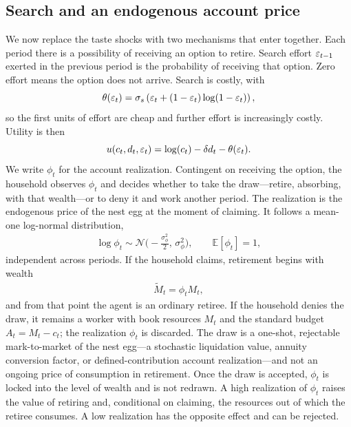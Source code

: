 \subsection{Search and an endogenous account price}
We now replace the taste shocks with two mechanisms that enter together. Each period
there is a possibility of receiving an option to retire. Search effort $\varepsilon_{t-1}$ exerted
in the previous period is the probability of receiving that option. Zero effort means the
option does not arrive. Search is costly, with
\begin{equation}
\theta(\varepsilon_t) = \sigma_s \left(\varepsilon_t + (1 - \varepsilon_t) \log (1 - \varepsilon_t)\right),
\end{equation}
so the first units of effort are cheap and further effort is increasingly costly. Utility is
then
\begin{equation}
u(c_t, d_t, \varepsilon_t) = \log(c_t) - \delta d_t - \theta(\varepsilon_t).
\end{equation}
We write $\phi_t$ for the account realization. Contingent on receiving the
option, the household observes $\phi_t$ and decides whether to take the draw---retire,
absorbing, with that wealth---or to deny it and work another period. The realization is
the endogenous price of the nest egg at the moment of claiming. It follows a mean-one
log-normal distribution,
\begin{align}
	\log \phi_t \sim \mathcal{N}\Big(-\frac{\sigma_\phi^2}{2},\,\sigma_\phi^2\Big),
	\qquad \mathbb{E}[\phi_t]=1,
	\label{eq:ret_price_dist}
\end{align}
independent across periods. If the household claims, retirement
begins with wealth
\begin{align}
	\tilde M_t = \phi_t M_t,
	\label{eq:ret_price_Mtilde}
\end{align}
and from that point the agent is an ordinary retiree. If the household denies the draw, it
remains a worker with book resources $M_t$ and the standard budget $A_t = M_t - c_t$; the
realization $\phi_t$ is discarded. The draw is a one-shot, rejectable mark-to-market of the
nest egg---a stochastic liquidation value, annuity conversion factor, or defined-contribution
account realization---and not an ongoing price of consumption in retirement. Once the draw
is accepted, $\phi_t$ is locked into the level of wealth and is not redrawn. A high realization
of $\phi_t$ raises the value of retiring and, conditional on claiming, the resources out of which
the retiree consumes. A low realization has the opposite effect and can be rejected.

